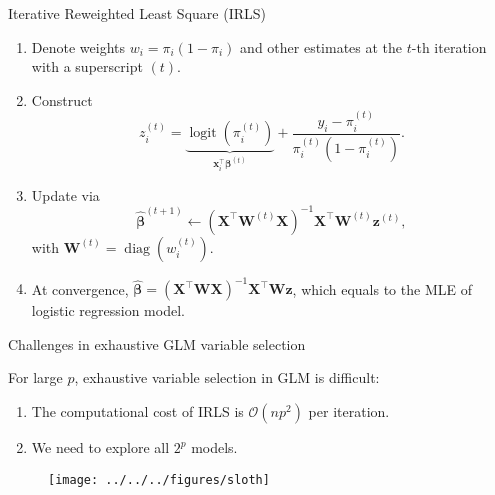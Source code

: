 \documentclass[12pt,aspectratio=169]{beamer}
\newcommand{\bx}{\boldsymbol{x}}
\newcommand{\bX}{\boldsymbol{X}}
\newcommand{\bW}{\boldsymbol{W}}
\newcommand{\bz}{\boldsymbol{z}}
\newcommand{\bbeta}{\boldsymbol{\beta}}
\newcommand{\bbetaHat}{\widehat{\boldsymbol{\beta}}}
\newcommand{\piit}{\pi_i^{(t)}}
\newcommand{\logit}{\operatorname{logit}}
\begin{document}
\begin{frame}{Iterative Reweighted Least Square (IRLS)}
	\begin{enumerate}
	\item Denote weights $ w_i = \pi_i (1-\pi_i)$ and other estimates at the $ t $-th iteration with a superscript $ (t) $.
	\item Construct 
	\begin{equation*}
	z_i^{(t)} = \underbrace{\logit\left( \piit \right)}_{\bx_i^\top \bbeta^{(t)}}+ \frac{y_i-\piit}{\piit(1-\piit)}.
	\end{equation*}
	\item Update via
	\begin{equation*}
	\bbetaHat^{(t+1)} \leftarrow (\bX^\top \bW^{(t)} \bX)^{-1} \bX^\top \bW^{(t)} \bz^{(t)},
	\end{equation*}
	with $ \bW^{(t)} = \operatorname{diag}\left(w_i^{(t)}\right)$.
	
	\item At convergence, $ \bbetaHat = (\bX^\top \bW \bX)^{-1}\bX^\top \bW \bz$, which equals to the MLE of logistic regression model.
\end{enumerate}
\end{frame}







\begin{frame}{Challenges in exhaustive GLM variable selection}

For large $ p $, exhaustive variable selection in GLM is difficult:
	\begin{enumerate}

\item The computational cost of IRLS is $ \mathcal{O}(np^2) $ per iteration.

\item We need to explore all $ 2^p $ models.
\end{enumerate}
\begin{figure}
	\centering
	\texttt{[image: ../../../figures/sloth]}
	\label{fig:sloth}
\end{figure}



\end{frame}
\end{document}
